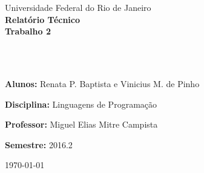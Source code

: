 \documentclass[12pt,a4paper]{article}
\author{Renata Porciuncula e Vinicius Mesquita}
\begin{document}
	
	

	\thispagestyle{plain}
	
	\noindent
	\begin{center}
		{\Large Universidade Federal do Rio de Janeiro \\
			\noindent
			{\Large\textbf{Relatório Técnico}}\\
			{\LARGE\textbf{Trabalho 2}}\\
			\hspace{15cm}
			\hfill \parbox{16cm}{\ ~\\ ~\\}
			\hfill \parbox{16cm}{\textbf{Alunos:} Renata P. Baptista e Vinicius M. de Pinho\\}
			\hfill \parbox{16cm}{\textbf{Disciplina:} Linguagens de Programação\\}
			\hfill \parbox{16cm}{\textbf{Professor:} Miguel Elias Mitre Campista\\}
			\hfill \parbox{16cm}{\textbf{Semestre:}  2016.2\\}
			
		}\end{center}
		
		
		\begin{center}
			\today\\
		\end{center}
		
\end{document}

